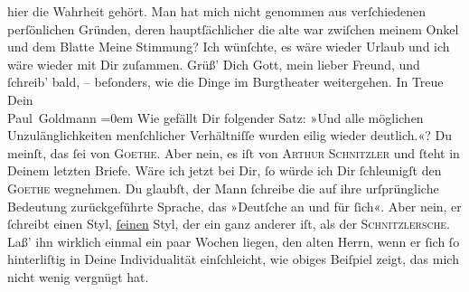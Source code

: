 \begin{ledgroupsized}[t]{13cm}
               hier die Wahrheit gehört. Man hat mich nicht genommen aus verſchiedenen {\pb}perſönlichen Gründen, deren hauptſächlicher die alte
                  \label{K_L02748-11v}\label{K_L02748-11h} war zwiſchen meinem Onkel und dem Blatte\pend
           \pstart
           Meine Stimmung? Ich wünſchte, es wäre wieder Urlaub und ich wäre wieder mit Dir
               zuſammen.\pend
           \pstart
           Grüß’ Dich Gott, mein lieber Freund, und ſchreib’ bald, – beſonders, wie die Dinge im
                  Burgtheater weitergehen.\pend
           \pstart
           In Treue {\\[\baselineskip]}Dein {\\[\baselineskip]}\spacefill\mbox{Paul Goldmann}\pend
           \leftskip=0em{}\pstart
           \noindent{}Wie gefällt Dir folgender Satz: »Und alle möglichen Unzulänglichkeiten
                  menſchlicher Verhältniſſe wurden eilig wieder deutlich.«? Du meinſt, das ſei von
                     \textsc{Goethe}. Aber nein, es iſt von \textsc{Arthur Schnitzler} und ſteht
                  in Deinem letzten Briefe. Wäre ich jetzt bei Dir, ſo würde ich Dir ſchleunigſt den
                     \textsc{Goethe} wegnehmen. Du glaubſt, der Mann ſchreibe  die auf ihre urſprüngliche Bedeutung zurückgeführte Sprache, das »Deutſche
                  an {\pb}und für ſich«. Aber nein, er ſchreibt einen
                  Styl, \uline{ſeinen} Styl, der ein ganz anderer iſt, als
                  der \textsc{Schnitzlersche}. Laß’ ihn wirklich einmal ein paar
                  Wochen liegen, den alten Herrn, wenn er ſich ſo hinterliſtig in Deine
                  Individualität einſchleicht, wie obiges Beiſpiel zeigt, das mich nicht wenig
                  vergnügt hat.\pend
           
         
         \endnumbering{}\end{ledgroupsized}  \newcommand{\dateiname}{L02748}\newcommand{\titel}{Paul Goldmann an Arthur Schnitzler, 23. 9. [1895]}\newcommand{\editorInnen}{Martin Anton Müller und Laura Untner}
      